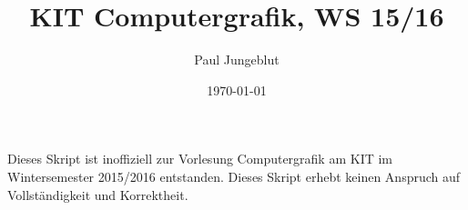 \documentclass{report}
\title{KIT Computergrafik, WS 15/16}
\author{Paul Jungeblut}
\date{\today}
\begin{document}
\maketitle
\newpage

\tableofcontents
\vfill
Dieses Skript ist inoffiziell zur Vorlesung Computergrafik am KIT im Wintersemester 2015/2016 entstanden.
Dieses Skript erhebt keinen Anspruch auf Vollständigkeit und Korrektheit.
\newpage


\end{document}
